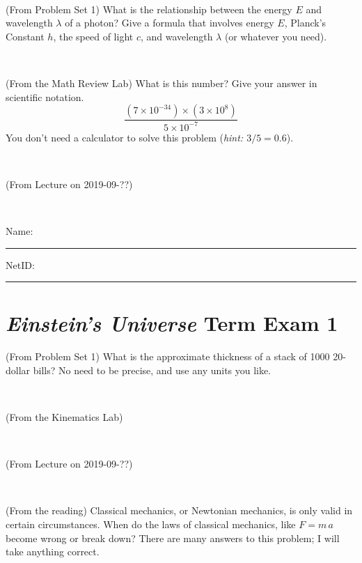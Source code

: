 \documentclass[12pt, letterpaper]{article}
\begin{document}
\vfill ~

\begin{problem} (From Problem Set 1)
What is the relationship between the energy $E$ and wavelength
$\lambda$ of a photon? Give a formula that involves energy $E$,
Planck's Constant $h$, the speed of light $c$, and wavelength
$\lambda$ (or whatever you need).
\end{problem}

\vfill ~

\begin{problem} (From the Math Review Lab)
What is this number? Give your answer in scientific notation.
$$
\frac{(7\times10^{-34})\times(3\times10^8)}{5\times10^{-7}}
$$
You don't need a calculator to solve this problem (\textit{hint: $3/5=0.6$}).
\end{problem}


\vfill ~

\begin{problem} (From Lecture on 2019-09-??)
\end{problem}


\vfill ~


\cleardoublepage



\noindent
Name: \rule[-1ex]{0.60\textwidth}{0.1pt}
NetID: \rule[-1ex]{0.20\textwidth}{0.1pt}

\section*{\textsl{Einstein's Universe} Term Exam 1}
\setcounter{problem}{1}


\begin{problem} (From Problem Set 1)
What is the approximate thickness of a stack of 1000 20-dollar bills?
No need to be precise, and use any units you like.
\end{problem}


\vfill ~

\begin{problem} (From the Kinematics Lab)

\end{problem}


\vfill ~

\begin{problem} (From Lecture on 2019-09-??)
\end{problem}


\vfill ~

\begin{problem} (From the reading)
Classical mechanics, or Newtonian mechanics, is only valid in certain
circumstances. When do the laws of classical mechanics, like $F =
m\,a$ become wrong or break down? There are many answers to this
problem; I will take anything correct.
\end{problem}
\end{document}
